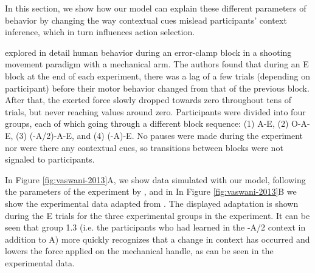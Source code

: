 \documentclass[a4paper,doc,floatsintext,natbib]{apa6}
\def \fref #1{Figure \ref{#1}}     %
\begin{document}
In this section, we show how our model can explain these different parameters of behavior by changing the way contextual cues mislead participants' context inference, which in turn influences action selection.

\cite{Vaswani_Decay_2013} explored in detail human behavior during an error-clamp block in a shooting movement paradigm with a mechanical arm. The authors found that during an E block at the end of each experiment, there was a lag of a few trials (depending on participant) before their motor behavior changed from that of the previous block. After that, the exerted force slowly dropped towards zero throughout tens of trials, but never reaching values around zero. Participants were divided into four groups, each of which going through a different block sequence: (1) A-E, (2) O-A-E, (3) (-A/2)-A-E, and (4) (-A)-E. No pauses were made during the experiment nor were there any contextual cues, so transitions between blocks were not signaled to participants.

In \fref{fig:vaswani-2013}A, we show data simulated with our model, following the parameters of the experiment by \cite{Vaswani_Decay_2013}, and in In \fref{fig:vaswani-2013}B we show the experimental data adapted from \cite{Vaswani_Decay_2013}. The displayed adaptation is shown during the E trials for the three experimental groups in the experiment. It can be seen that group 1.3 (i.e. the participants who had learned in the -A/2 context in addition to A) more quickly recognizes that a change in context has occurred and lowers the force applied on the mechanical handle, as can be seen in the experimental data.
\end{document}

